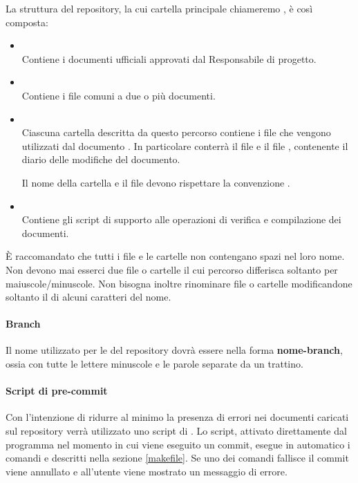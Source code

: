 La struttura del repository, la cui cartella principale chiameremo , è così composta:
\begin{itemize}
 \item \textbf{} \\
	Contiene i documenti ufficiali approvati dal Responsabile di progetto.

 \item \textbf{} \\
	Contiene i file comuni a due o più documenti.

 \item \textbf{} \\
	Ciascuna cartella descritta da questo percorso contiene i file che vengono utilizzati dal documento . In particolare conterrà il file  e il file , contenente il diario delle modifiche del documento.
	
	Il nome della cartella  e il file  devono rispettare la convenzione .

 \item \textbf{} \\
	Contiene gli script di supporto alle operazioni di verifica e compilazione dei documenti.
\end{itemize}

È raccomandato che tutti i file e le cartelle non contengano spazi nel loro nome. Non devono mai esserci due file o cartelle il cui percorso differisca soltanto per maiuscole/minuscole. Non bisogna inoltre rinominare file o cartelle modificandone soltanto il  di alcuni caratteri del nome.

\paragraph{Branch}

Il nome utilizzato per le  del repository dovrà essere nella forma \textbf{nome-branch}, ossia con tutte le lettere minuscole e le parole separate da un trattino.

\paragraph{Script di pre-commit}

Con l'intenzione di ridurre al minimo la presenza di errori nei documenti caricati sul repository verrà utilizzato uno script di . Lo script, attivato direttamente dal programma  nel momento in cui viene eseguito un commit, esegue in automatico i comandi  e  descritti nella sezione \ref{makefile}. Se uno dei comandi fallisce il commit viene annullato e all'utente viene mostrato un messaggio di errore.


